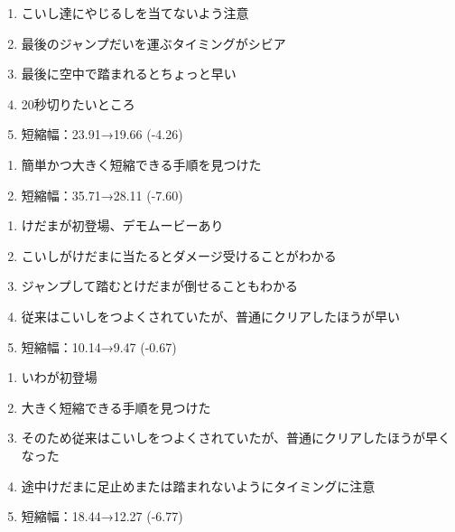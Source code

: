 \begin{enumerate}[label={\sarrow}]
\item こいし達にやじるしを当てないよう注意
\item 最後のジャンプだいを運ぶタイミングがシビア
\item 最後に空中で踏まれるとちょっと早い
\item 20秒切りたいところ
\item 短縮幅：23.91→19.66 (-4.26)
\end{enumerate}



\begin{enumerate}[label={\sarrow}]
\item 簡単かつ大きく短縮できる手順を見つけた
\item 短縮幅：35.71→28.11 (-7.60)
\end{enumerate}



\begin{enumerate}[label={\sarrow}]
\item けだまが初登場、デモムービーあり
\item こいしがけだまに当たるとダメージ受けることがわかる
\item ジャンプして踏むとけだまが倒せることもわかる
\item 従来はこいしをつよくされていたが、普通にクリアしたほうが早い
\item 短縮幅：10.14→9.47 (-0.67)
\end{enumerate}



\clearpage
\begin{enumerate}[label={\sarrow}]
\item いわが初登場
\item 大きく短縮できる手順を見つけた
\item そのため従来はこいしをつよくされていたが、普通にクリアしたほうが早くなった
\item 途中けだまに足止めまたは踏まれないようにタイミングに注意
\item 短縮幅：18.44→12.27 (-6.77)
\end{enumerate}



